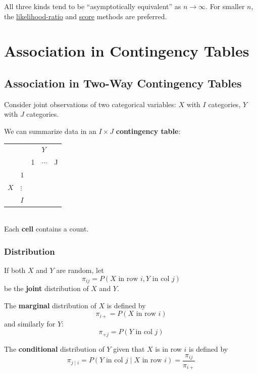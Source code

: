 \documentclass[11pt]{elegantbook}
\begin{document}
All three kinds tend to be “asymptotically equivalent” as $n \rightarrow \infty$. For smaller $n$, the \underline{likelihood-ratio} and \underline{score} methods are preferred.

\chapter{Association in Contingency Tables}
\section{Association in Two-Way Contingency Tables}
Consider joint observations of two categorical variables: $X$ with $I$ categories, $Y$ with $J$ categories.

We can summarize data in an $I \times J$ \textbf{contingency table}:
\begin{table}[htbp]
    \centering
    \begin{tabular}{lllll}
        &&&$Y$&\\
        &&1&$\cdots$&J\\
        \cline{3-5}
        & \multicolumn{1}{l|}{$1$} & \multicolumn{1}{l|}{} & \multicolumn{1}{l|}{} & \multicolumn{1}{l|}{} \\
        \cline{3-5}
        $X$ &\multicolumn{1}{l|}{$\vdots$}  & \multicolumn{1}{l|}{} & \multicolumn{1}{l|}{} & \multicolumn{1}{l|}{} \\ \cline{3-5}
        & \multicolumn{1}{l|}{$I$} & \multicolumn{1}{l|}{} & \multicolumn{1}{l|}{} & \multicolumn{1}{l|}{} \\ \cline{3-5}
    \end{tabular}
\end{table}\\
Each \textbf{cell} contains a count.

\subsection{Distribution}
If both $X$ and $Y$ are random, let $$\pi_{ij}=P(X\text{ in row }i, Y\text{ in col }j)$$
be the \textbf{joint} distribution of $X$ and $Y$.

The \textbf{marginal} distribution of $X$ is defined by $$\pi_{i+}=P(X\text{ in row }i)$$
and similarly for $Y$:
$$\pi_{+j}=P(Y\text{ in col }j)$$

The \textbf{conditional} distribution of $Y$ given that $X$ is in row $i$ is defined by
$$\pi_{j\mid i}=P(Y\text{ in col }j\mid X\text{ in row }i)=\frac{\pi_{ij}}{\pi_{i+}}$$
\end{document}
